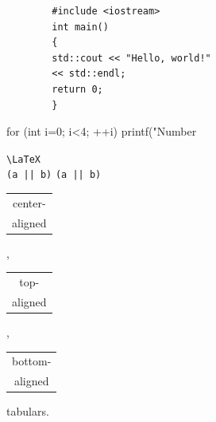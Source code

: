 \documentclass{book}
\begin{document}
		\begin{verbatim}
		#include <iostream>
		int main()
		{
		std::cout << "Hello, world!"
		<< std::endl;
		return 0;
		}
		\end{verbatim}
		\begin{verbatim*}
		for (int i=0; i<4; ++i)
		printf("Number %
		\end{verbatim*}
		\verb|\LaTeX| \\
		\verb+(a || b)+ \verb*+(a || b)+
		
		
		
		\begin{tabular}{|c|}
		center-\\ aligned \\
		\end{tabular},
		\begin{tabular}[t]{|c|}
		top-\\ aligned \\
		\end{tabular},
		\begin{tabular}[b]{|c|}
		bottom-\\ aligned\\
		\end{tabular} tabulars.
		
\end{document}
